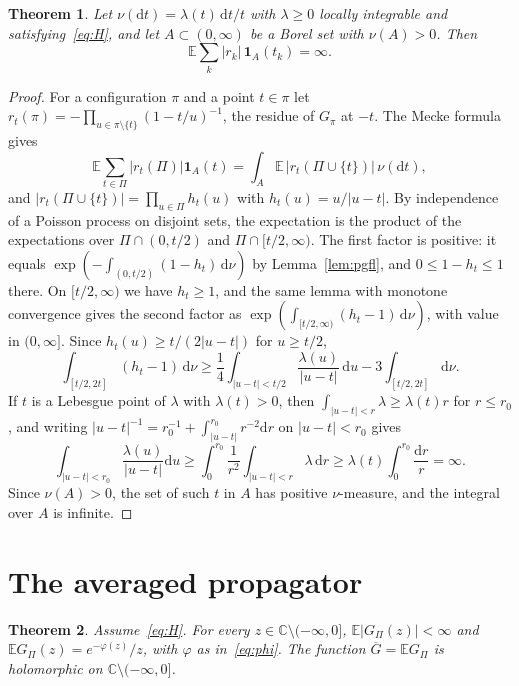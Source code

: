 \documentclass[aps,prd,twocolumn,superscriptaddress,nofootinbib,longbibliography,floatfix,amsmath,amssymb,10pt]{revtex4-2}
\newtheorem{theorem}{Theorem}
\theoremstyle{definition}
\theoremstyle{remark}
\newcommand{\C}{\mathbb{C}}
\newcommand{\E}{\mathbb{E}}
\newcommand{\Gbar}{\overline{G}}
\newcommand{\dd}{\mathrm{d}}
\newcommand{\cut}{\C\setminus(-\infty,0]}
\begin{document}
\begin{theorem}\label{thm:notaverageable}
Let $\nu(\dd t)=\lambda(t)\,\dd t/t$ with $\lambda\ge0$ locally integrable and
satisfying~\eqref{eq:H}, and let $A\subset(0,\infty)$ be a Borel set with
$\nu(A)>0$. Then
\[
\E\sum_k|r_k|\,\mathbf 1_A(t_k)=\infty .
\]
\end{theorem}

\begin{proof}
For a configuration $\pi$ and a point $t\in\pi$ let
$r_t(\pi)=-\prod_{u\in\pi\setminus\{t\}}(1-t/u)^{-1}$, the residue of
$G_\pi$ at $-t$. The Mecke formula~\cite[Thm.~4.1]{LastPenrose2017} gives
\[
\E\sum_{t\in\Pi}|r_t(\Pi)|\mathbf 1_A(t)=\int_A\E\,|r_t(\Pi\cup\{t\})|\,
\nu(\dd t),
\]
and $|r_t(\Pi\cup\{t\})|=\prod_{u\in\Pi}h_t(u)$ with
$h_t(u)=u/|u-t|$. By independence of a Poisson process on disjoint sets,
the expectation is the product of the expectations over
$\Pi\cap(0,t/2)$ and $\Pi\cap[t/2,\infty)$. The first factor is positive: it
equals $\exp(-\int_{(0,t/2)}(1-h_t)\,\dd\nu)$ by
Lemma~\ref{lem:pgfl}, and $0\le1-h_t\le1$ there. On $[t/2,\infty)$ we have
$h_t\ge1$, and the same lemma with monotone convergence gives the second
factor as $\exp(\int_{[t/2,\infty)}(h_t-1)\,\dd\nu)$, with value in
$(0,\infty]$. Since $h_t(u)\ge t/(2|u-t|)$ for $u\ge t/2$,
\[
\int_{[t/2,2t]}(h_t-1)\,\dd\nu\ge\frac14\int_{|u-t|<t/2}
\frac{\lambda(u)}{|u-t|}\,\dd u-3\int_{[t/2,2t]}\dd\nu.
\]
If $t$ is a Lebesgue point of $\lambda$ with $\lambda(t)>0$, then
$\int_{|u-t|<r}\lambda\ge\lambda(t)r$ for $r\le r_0$, and writing
$|u-t|^{-1}=r_0^{-1}+\int_{|u-t|}^{r_0}r^{-2}\dd r$ on $|u-t|<r_0$ gives
\[
\int_{|u-t|<r_0}\frac{\lambda(u)}{|u-t|}\dd u\ge
\int_0^{r_0}\frac{1}{r^2}\int_{|u-t|<r}\lambda\,\dd r\ge
\lambda(t)\int_0^{r_0}\frac{\dd r}{r}=\infty .
\]
Since $\nu(A)>0$, the set of such $t$ in $A$ has positive $\nu$-measure, and
the integral over $A$ is infinite.
\end{proof}

\section{The averaged propagator}\label{sec:average}

\begin{theorem}\label{thm:average}
Assume~\eqref{eq:H}. For every $z\in\cut$, $\E|G_\Pi(z)|<\infty$ and
$\E G_\Pi(z)=e^{-\varphi(z)}/z$, with $\varphi$ as in~\eqref{eq:phi}. The
function $\Gbar=\E G_\Pi$ is holomorphic on $\cut$.
\end{theorem}
\end{document}
